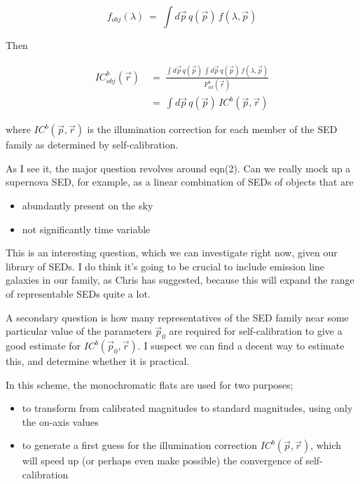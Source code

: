 \documentclass[12pt,preprint]{aastex}
\begin{document}
\begin{equation}
f_{obj}(\lambda)~=~\int {d\vec{p} \, q(\vec{p}) \, f(\lambda, \vec{p})}
\end{equation}

Then

\begin{align}
IC^{b}_{obj}(\vec{r})~&=~\frac {\int {d\vec{p} \, q(\vec{p}) \, \int
    {d\vec{p} \, q(\vec{p}) \, f(\lambda,
      \vec{p})}}}{F^{b}_{wl}(\vec{r})}\\
    &=~\int {d\vec{p} \, q(\vec{p}) \, IC^{b}(\vec{p}, \vec{r})}
\end{align}

where $IC^{b}(\vec{p}, \vec{r})$ is the illumination correction for
each member of the SED family as determined by self-calibration.

As I see it, the major question revolves around eqn(2). Can we really
mock up a supernova SED, for example, as a linear combination of SEDs of objects
that are
\begin{itemize}
\item abundantly present on the sky
\item not significantly time variable
\end{itemize}

This is an interesting question, which we can investigate right now,
given our library of SEDs.  I do think it's going to be crucial to
include emission line galaxies in our family, as Chris has suggested,
because this will expand the range of representable SEDs quite a lot.

A secondary question is how many representatives of the SED family
near some particular value of the parameters $\vec{p}_0$ are required
for self-calibration to give a good estimate for $IC^{b}(\vec{p}_0,
\vec{r})$.  I suspect we can find a decent way to estimate this, and
determine whether it is practical.

In this scheme, the monochromatic flats are used for two purposes;

\begin{itemize}
\item to transform from calibrated magnitudes to standard magnitudes,
  using only the on-axis values
\item to generate a first guess for the illumination correction
  $IC^{b}(\vec{p}, \vec{r})$, which will speed up (or perhaps even
  make possible) the convergence of self-calibration
\end{itemize}   
 
\end{document}
